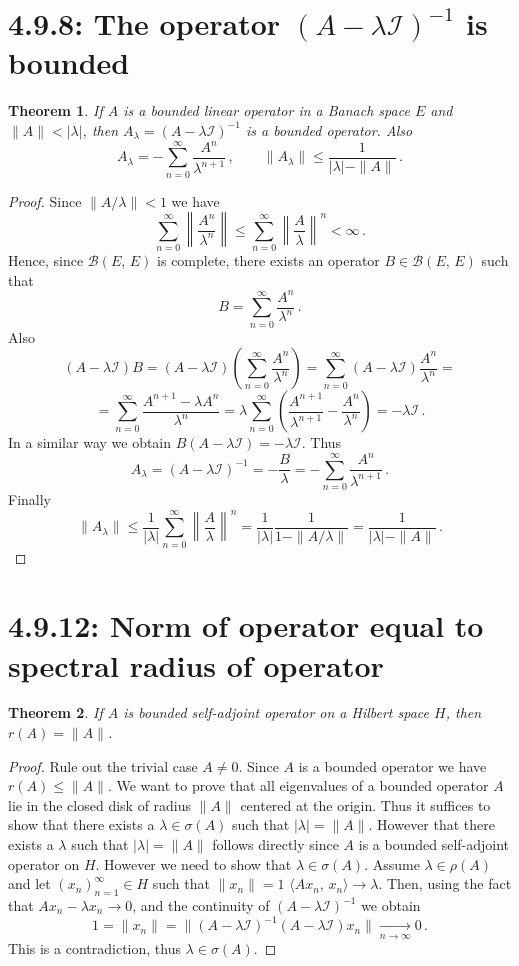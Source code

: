 \documentclass[12pt, a4paper]{article}
\newtheorem{theorem}{Theorem}[section]
\begin{document}
\section{4.9.8: The operator $(A-\lambda\mathcal{I})^{-1}$ is bounded}
\begin{theorem}
If $A$ is a bounded linear operator in a Banach space $E$ and $\|A\|<|\lambda|$, then $A_\lambda=(A-\lambda\mathcal{I})^{-1}$ is a bounded operator. Also
\[
    A_\lambda=-\sum_{n=0}^\infty\dfrac{A^n}{\lambda^{n+1}}\,,\qquad \|A_\lambda\|\leq\dfrac{1}{|\lambda|-\|A\|}\,.
\]
\end{theorem}
\begin{proof}
Since $\|A/\lambda\|<1$ we have
\[
    \sum_{n=0}^\infty\left\|\dfrac{A^n}{\lambda^n}\right\|\leq\sum_{n=0}^\infty\left\|\dfrac{A}{\lambda}\right\|^n<\infty\,.
\]
Hence, since $\mathcal{B}(E,\,E)$ is complete, there exists an operator $B\in\mathcal{B}(E,\,E)$ such that
\[
    B=\sum_{n=0}^\infty\dfrac{A^n}{\lambda^n}\,.
\]
Also
\[
    (A-\lambda\mathcal{I})B=(A-\lambda\mathcal{I})\left(\sum_{n=0}^\infty\dfrac{A^n}{\lambda^n}\right)=\sum_{n=0}^\infty(A-\lambda\mathcal{I})\dfrac{A^n}{\lambda^n}=
\]
\[
    =\sum_{n=0}^\infty\dfrac{A^{n+1}-\lambda A^n}{\lambda^n}=\lambda\sum_{n=0}^\infty\left (\dfrac{A^{n+1}}{\lambda^{n+1}}-\dfrac{A^n}{\lambda^n}\right)=-\lambda\mathcal{I}\,.
\]
In a similar way we obtain $B(A-\lambda\mathcal{I})=-\lambda\mathcal{I}$. Thus
\[
    A_\lambda=(A-\lambda\mathcal{I})^{-1}=-\dfrac{B}{\lambda}=-\sum_{n=0}^\infty\dfrac{A^n}{\lambda^{n+1}}\,.
\]
Finally
\[
    \|A_\lambda\|\leq\dfrac{1}{|\lambda|}\sum_{n=0}^\infty\left\|\dfrac{A}{\lambda}\right\|^n=\dfrac{1}{|\lambda|}\dfrac{1}{1-\|A/\lambda\|}=\dfrac{1}{|\lambda|-\|A\|}\,.
\]
\end{proof}
\section{4.9.12: Norm of operator equal to spectral radius of operator}
\begin{theorem}
If $A$ is bounded self-adjoint operator on a Hilbert space $H$, then $r(A)=\|A\|$.
\end{theorem}
\begin{proof}
Rule out the trivial case $A\neq 0$. Since $A$ is a bounded operator we have $r(A)\leq \|A\|$. We want to prove that all eigenvalues of a bounded operator $A$ lie in the closed disk of radius $\|A\|$ centered at the origin. Thus it suffices to show that there exists a $\lambda\in\sigma(A)$ such that $|\lambda|=\|A\|$. However that there exists a $\lambda$ such that $|\lambda|=\|A\|$ follows directly since $A$ is a bounded self-adjoint operator on $H$. However we need to show that $\lambda\in \sigma(A)$. Assume $\lambda\in\rho(A)$ and let $(x_n)_{n=1}^\infty\in H$ such that $\|x_n\|=1$ $\langle Ax_n,\,x_n\rangle\to\lambda$. Then, using the fact that $Ax_n-\lambda x_n\to 0$, and the continuity of $(A-\lambda\mathcal{I})^{-1}$ we obtain
\[
    1=\|x_n\|=\|(A-\lambda\mathcal{I})^{-1}(A-\lambda\mathcal{I})x_n\|\underset{n\to\infty}{\longrightarrow}0\,.
\]
This is a contradiction, thus $\lambda\in\sigma(A)$.
\end{proof}
\end{document}
